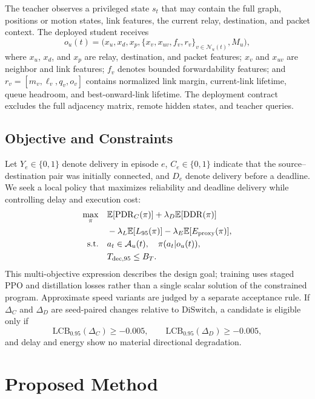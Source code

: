 \documentclass{ieeeaccess}
\newcommand{\DS}{DiSwitch}
\newcommand{\pdr}{\mathrm{PDR}}
\newcommand{\E}{\mathbb{E}}
\begin{document}
The teacher observes a privileged state $s_t$ that may contain the full graph, positions or motion states, link features, the current relay, destination, and packet context. The deployed student receives
\begin{equation}
o_u(t)=\big(x_u, x_d, x_p, \{x_v,x_{uv},f_v,r_v\}_{v\in\mathcal{N}_u(t)},M_u\big),
\end{equation}
where $x_u$, $x_d$, and $x_p$ are relay, destination, and packet features; $x_v$ and $x_{uv}$ are neighbor and link features; $f_v$ denotes bounded forwardability features; and $r_v=[m_v,\ell_v,q_v,o_v]$ contains normalized link margin, current-link lifetime, queue headroom, and best-onward-link lifetime. The deployment contract excludes the full adjacency matrix, remote hidden states, and teacher queries.

\subsection{Objective and Constraints}

Let $Y_e\in\{0,1\}$ denote delivery in episode $e$, $C_e\in\{0,1\}$ indicate that the source--destination pair was initially connected, and $D_e$ denote delivery before a deadline. We seek a local policy that maximizes reliability and deadline delivery while controlling delay and execution cost:
\begin{align}
\max_{\pi} \quad
& \E[\pdr_C(\pi)] + \lambda_D\E[\mathrm{DDR}(\pi)] \notag\\
& {}-\lambda_L\E[L_{95}(\pi)]-\lambda_E\E[E_{\mathrm{proxy}}(\pi)],\\
\text{s.t.}\quad
& a_t\in\mathcal{A}_u(t),\quad \pi(a_t|o_u(t)), \notag\\
& T_{\mathrm{dec},95}\leq B_T.
\end{align}
This multi-objective expression describes the design goal; training uses staged PPO and distillation losses rather than a single scalar solution of the constrained program. Approximate speed variants are judged by a separate acceptance rule. If $\Delta_C$ and $\Delta_D$ are seed-paired changes relative to \DS{}, a candidate is eligible only if
\begin{equation}
\mathrm{LCB}_{0.95}(\Delta_C)\geq-0.005,\qquad
\mathrm{LCB}_{0.95}(\Delta_D)\geq-0.005,
\label{eq:gate}
\end{equation}
and delay and energy show no material directional degradation.

\section{Proposed Method}
\end{document}
